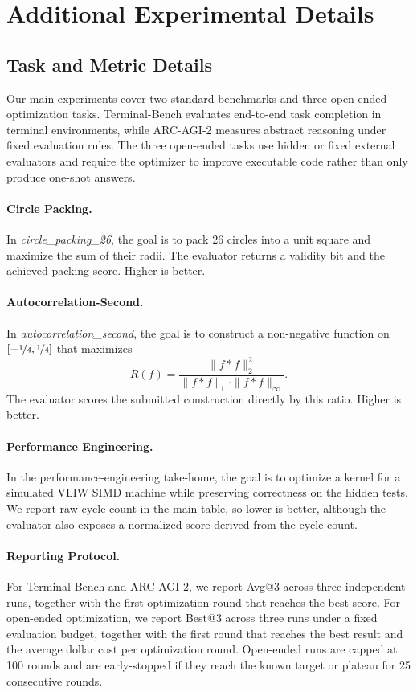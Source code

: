 \section{Additional Experimental Details}
\label{appendix:details}

\subsection{Task and Metric Details}
\label{appendix:task_metric_details}

Our main experiments cover two standard benchmarks and three open-ended optimization tasks. Terminal-Bench evaluates end-to-end task completion in terminal environments, while ARC-AGI-2 measures abstract reasoning under fixed evaluation rules. The three open-ended tasks use hidden or fixed external evaluators and require the optimizer to improve executable code rather than only produce one-shot answers.

\paragraph{Circle Packing.}
In \textit{circle\_packing\_26}, the goal is to pack 26 circles into a unit square and maximize the sum of their radii. The evaluator returns a validity bit and the achieved packing score. Higher is better.

\paragraph{Autocorrelation-Second.}
In \textit{autocorrelation\_second}, the goal is to construct a non-negative function on $[-\nicefrac{1}{4}, \nicefrac{1}{4}]$ that maximizes
\[
R(f)=\frac{\|f*f\|_2^2}{\|f*f\|_1 \cdot \|f*f\|_\infty}.
\]
The evaluator scores the submitted construction directly by this ratio. Higher is better.

\paragraph{Performance Engineering.}
In the performance-engineering take-home, the goal is to optimize a kernel for a simulated VLIW SIMD machine while preserving correctness on the hidden tests. We report raw cycle count in the main table, so lower is better, although the evaluator also exposes a normalized score derived from the cycle count.

\paragraph{Reporting Protocol.}
For Terminal-Bench and ARC-AGI-2, we report Avg@3 across three independent runs, together with the first optimization round that reaches the best score. For open-ended optimization, we report Best@3 across three runs under a fixed evaluation budget, together with the first round that reaches the best result and the average dollar cost per optimization round. Open-ended runs are capped at 100 rounds and are early-stopped if they reach the known target or plateau for 25 consecutive rounds.

